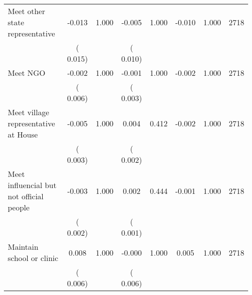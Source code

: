 \begin{tabular}{l*{7}{c}}
 Meet other state representative       &             -0.013       &        1.000  &             -0.005       &        1.000  &             -0.010       &              1.000 &  2718 \\ 
                       &       (       0.015)             &                               &       (       0.010)                     &                               &                                               &                                &                      \\ 

 Meet NGO       &             -0.002       &        1.000  &             -0.001       &        1.000  &             -0.002       &              1.000 &  2718 \\ 
                       &       (       0.006)             &                               &       (       0.003)                     &                               &                                               &                                &                      \\ 

 Meet village representative at House       &             -0.005       &        1.000  &              0.004       &        0.412  &             -0.002       &              1.000 &  2718 \\ 
                       &       (       0.003)             &                               &       (       0.002)                     &                               &                                               &                                &                      \\ 

 Meet influencial but not official people       &             -0.003       &        1.000  &              0.002       &        0.444  &             -0.001       &              1.000 &  2718 \\ 
                       &       (       0.002)             &                               &       (       0.001)                     &                               &                                               &                                &                      \\ 

 Maintain school or clinic       &              0.008       &        1.000  &             -0.000       &        1.000  &              0.005       &              1.000 &  2718 \\ 
                       &       (       0.006)             &                               &       (       0.006)                     &                               &                                               &                                &                      \\ 


\end{tabular}
